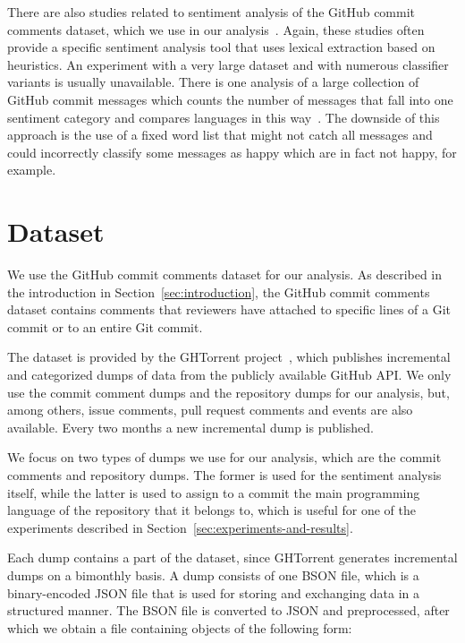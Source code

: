\documentclass{article}
\begin{document}
There are also studies related to sentiment analysis of the GitHub commit 
comments dataset, which we use in our 
analysis~\cite{guzman2014github,pletea2014security}. Again, these studies often 
provide a specific sentiment analysis tool that uses lexical extraction based 
on heuristics. An experiment with a very large dataset and with numerous 
classifier variants is usually unavailable. There is one analysis of a large 
collection of GitHub commit messages which counts the number of messages that 
fall into one sentiment category and compares languages in this 
way~\cite{geeksta}. The downside of this approach is the use of a fixed word 
list that might not catch all messages and could incorrectly classify some 
messages as happy which are in fact not happy, for example.

\section{Dataset}\label{sec:dataset}
We use the GitHub commit comments dataset for our analysis. As described in the
introduction in Section~\ref{sec:introduction}, the GitHub commit comments
dataset contains comments that reviewers have attached to specific lines of
a Git commit or to an entire Git commit.

The dataset is provided by the GHTorrent project~\cite{gousios2013ghtorrent},
which publishes incremental and categorized dumps of data from the publicly
available GitHub API\@. We only use the commit comment dumps and the
repository dumps for our analysis, but, among others, issue comments, pull
request comments and events are also available. Every two months a new
incremental dump is published.

We focus on two types of dumps we use for our analysis, which are the
commit comments and repository dumps. The former is used for the sentiment
analysis itself, while the latter is used to assign to a commit the main 
programming language of the repository that it belongs to, which is useful for 
one of the experiments described in Section~\ref{sec:experiments-and-results}.

Each dump contains a part of the dataset, since GHTorrent generates incremental 
dumps on a bimonthly basis. A dump consists of one BSON file, which is 
a binary-encoded JSON file that is used for storing and exchanging data in 
a structured manner. The BSON file is converted to JSON and preprocessed, after 
which we obtain a file containing objects of the following form:
\end{document}
